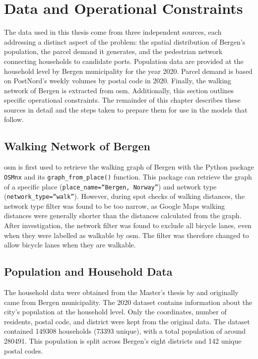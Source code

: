 \documentclass[12pt]{article}
\begin{document}
\section{Data and Operational Constraints}
\label{sec:data}

The data used in this thesis come from three independent sources, each addressing a distinct aspect of the problem: the spatial distribution of Bergen's population, the parcel demand it generates, and the pedestrian network connecting households to candidate ports. Population data are provided at the household level by Bergen municipality for the year 2020. Parcel demand is based on PostNord's weekly volumes by postal code in 2020. Finally, the walking network of Bergen is extracted from \ac{osm}. Additionally, this section outlines specific operational constraints. The remainder of this chapter describes these sources in detail and the steps taken to prepare them for use in the models that follow.

\subsection{Walking Network of Bergen}
\label{subsec:walking-network-bergen}

\ac{osm} is first used to retrieve the walking graph of Bergen with the Python package \texttt{OSMnx} \parencite{osmnx} and its \texttt{graph\_from\_place()} function. This package can retrieve the graph of a specific place (\texttt{place\_name=``Bergen, Norway''}) and network type (\texttt{network\_type=``walk''}). However, during spot checks of walking distances, the network type filter was found to be too narrow, as Google Maps walking distances were generally shorter than the distances calculated from the graph. After investigation, the network filter was found to exclude all bicycle lanes, even when they were labelled as walkable by \ac{osm}. The filter was therefore changed to allow bicycle lanes when they are walkable.

\subsection{Population and Household Data}
\label{subsec:population-household-data}

The household data were obtained from the Master's thesis by \textcite{pop_thesis} and originally came from Bergen municipality. The 2020 dataset contains information about the city's population at the household level. Only the coordinates, number of residents, postal code, and district were kept from the original data. The dataset contained \num{149308} households (\num{73393} unique), with a total population of around \num{280491}. This population is split across Bergen's eight districts and \num{142} unique postal codes.
\end{document}
